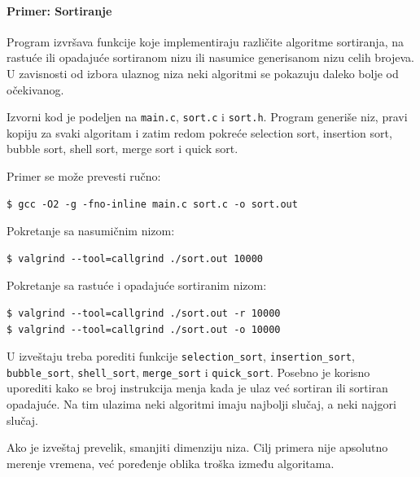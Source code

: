 \paragraph{Primer: Sortiranje}\label{primer-sortiranje}

Program izvršava funkcije koje implementiraju različite algoritme sortiranja, na rastuće ili opadajuće sortiranom nizu ili nasumice generisanom nizu celih brojeva. U zavisnosti od izbora ulaznog niza neki algoritmi se pokazuju daleko bolje od očekivanog.

Izvorni kod je podeljen na \texttt{main.c}, \texttt{sort.c} i \texttt{sort.h}. Program generiše niz, pravi kopiju za svaki algoritam i zatim redom pokreće selection sort, insertion sort, bubble sort, shell sort, merge sort i quick sort.

Primer se može prevesti ručno:

\begin{verbatim}
$ gcc -O2 -g -fno-inline main.c sort.c -o sort.out
\end{verbatim}

Pokretanje sa nasumičnim nizom:

\begin{verbatim}
$ valgrind --tool=callgrind ./sort.out 10000
\end{verbatim}

Pokretanje sa rastuće i opadajuće sortiranim nizom:

\begin{verbatim}
$ valgrind --tool=callgrind ./sort.out -r 10000
$ valgrind --tool=callgrind ./sort.out -o 10000
\end{verbatim}

U izveštaju treba porediti funkcije \texttt{selection\_sort}, \texttt{insertion\_sort}, \texttt{bubble\_sort}, \texttt{shell\_sort}, \texttt{merge\_sort} i \texttt{quick\_sort}. Posebno je korisno uporediti kako se broj instrukcija menja kada je ulaz već sortiran ili sortiran opadajuće. Na tim ulazima neki algoritmi imaju najbolji slučaj, a neki najgori slučaj.

Ako je izveštaj prevelik, smanjiti dimenziju niza. Cilj primera nije apsolutno merenje vremena, već poređenje oblika troška između algoritama.
